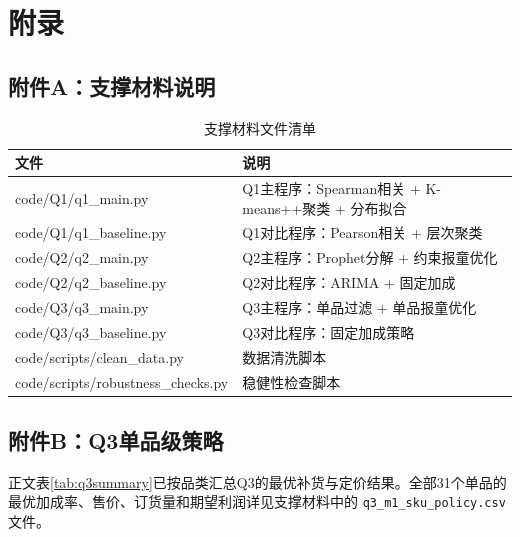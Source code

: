 
\makeatletter
\let\@oldaddcontentsline\addcontentsline
\renewcommand{\addcontentsline}[3]{}
\section*{附录}
\let\addcontentsline\@oldaddcontentsline
\makeatother

\subsection*{附件A：支撑材料说明}

\begin{table}[H]
  \centering
  \caption{支撑材料文件清单}
  \label{tab:appendix}
  \renewcommand{\arraystretch}{1.2}
  \begin{tabularx}{\textwidth}{LX}
    \toprule
    文件 & 说明 \\
    \midrule
    code/Q1/q1\_main.py & Q1主程序：Spearman相关 + K-means++聚类 + 分布拟合 \\
    code/Q1/q1\_baseline.py & Q1对比程序：Pearson相关 + 层次聚类 \\
    code/Q2/q2\_main.py & Q2主程序：Prophet分解 + 约束报童优化 \\
    code/Q2/q2\_baseline.py & Q2对比程序：ARIMA + 固定加成 \\
    code/Q3/q3\_main.py & Q3主程序：单品过滤 + 单品报童优化 \\
    code/Q3/q3\_baseline.py & Q3对比程序：固定加成策略 \\
    code/scripts/clean\_data.py & 数据清洗脚本 \\
    code/scripts/robustness\_checks.py & 稳健性检查脚本 \\
    \bottomrule
  \end{tabularx}
\end{table}

\subsection*{附件B：Q3单品级策略}

正文表\ref{tab:q3summary}已按品类汇总Q3的最优补货与定价结果。全部31个单品的最优加成率、售价、订货量和期望利润详见支撑材料中的 \texttt{q3\_m1\_sku\_policy.csv} 文件。
